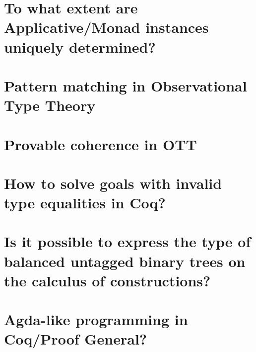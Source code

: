 \documentclass{book}
\begin{document}
\section{To what extent are Applicative/Monad instances uniquely determined?}


\section{Pattern matching in Observational Type Theory}


\section{Provable coherence in OTT}


\section{How to solve goals with invalid type equalities in Coq?}


\section{Is it possible to express the type of balanced untagged binary trees on the calculus of constructions?}


\section{Agda-like programming in Coq/Proof General?}

\end{document}
